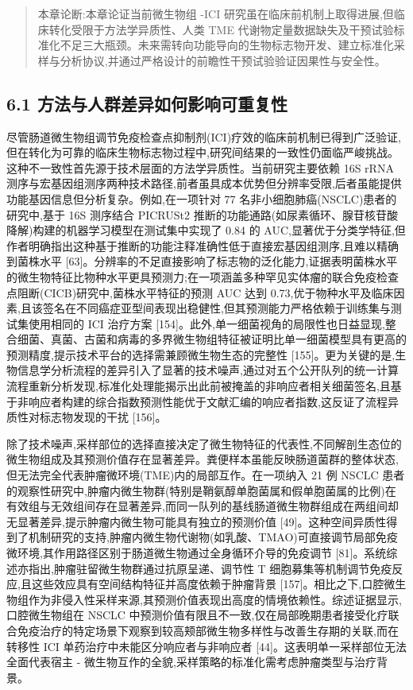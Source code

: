 \begin{quote}
本章论断:本章论证当前微生物组 -ICI 研究虽在临床前机制上取得进展,但临床转化受限于方法学异质性、人类 TME 代谢物定量数据缺失及干预试验标准化不足三大瓶颈。未来需转向功能导向的生物标志物开发、建立标准化采样与分析协议,并通过严格设计的前瞻性干预试验验证因果性与安全性。
\end{quote}

\subsection{6.1 方法与人群差异如何影响可重复性}\label{ux65b9ux6cd5ux4e0eux4ebaux7fa4ux5deeux5f02ux5982ux4f55ux5f71ux54cdux53efux91cdux590dux6027}

尽管肠道微生物组调节免疫检查点抑制剂(ICI)疗效的临床前机制已得到广泛验证,但在转化为可靠的临床生物标志物过程中,研究间结果的一致性仍面临严峻挑战。这种不一致性首先源于技术层面的方法学异质性。当前研究主要依赖 16S rRNA 测序与宏基因组测序两种技术路径,前者虽具成本优势但分辨率受限,后者虽能提供功能基因信息但分析复杂。例如,在一项针对 77 名非小细胞肺癌(NSCLC)患者的研究中,基于 16S 测序结合 PICRUSt2 推断的功能通路(如尿素循环、腺苷核苷酸降解)构建的机器学习模型在测试集中实现了 0.84 的 AUC,显著优于分类学特征,但作者明确指出这种基于推断的功能注释准确性低于直接宏基因组测序,且难以精确到菌株水平 {[}63{]}。分辨率的不足直接影响了标志物的泛化能力,证据表明菌株水平的微生物特征比物种水平更具预测力;在一项涵盖多种罕见实体瘤的联合免疫检查点阻断(CICB)研究中,菌株水平特征的预测 AUC 达到 0.73,优于物种水平及临床因素,且该签名在不同癌症亚型间表现出稳健性,但其预测能力严格依赖于训练集与测试集使用相同的 ICI 治疗方案 {[}154{]}。此外,单一细菌视角的局限性也日益显现,整合细菌、真菌、古菌和病毒的多界微生物组特征被证明比单一细菌模型具有更高的预测精度,提示技术平台的选择需兼顾微生物生态的完整性 {[}155{]}。更为关键的是,生物信息学分析流程的差异引入了显著的技术噪声,通过对五个公开队列的统一计算流程重新分析发现,标准化处理能揭示出此前被掩盖的非响应者相关细菌签名,且基于非响应者构建的综合指数预测性能优于文献汇编的响应者指数,这反证了流程异质性对标志物发现的干扰 {[}156{]}。

除了技术噪声,采样部位的选择直接决定了微生物特征的代表性,不同解剖生态位的微生物组成及其预测价值存在显著差异。粪便样本虽能反映肠道菌群的整体状态,但无法完全代表肿瘤微环境(TME)内的局部互作。在一项纳入 21 例 NSCLC 患者的观察性研究中,肿瘤内微生物群(特别是鞘氨醇单胞菌属和假单胞菌属的比例)在有效组与无效组间存在显著差异,而同一队列的基线肠道微生物群组成在两组间却无显著差异,提示肿瘤内微生物可能具有独立的预测价值 {[}49{]}。这种空间异质性得到了机制研究的支持,肿瘤内微生物代谢物(如乳酸、TMAO)可直接调节局部免疫微环境,其作用路径区别于肠道微生物通过全身循环介导的免疫调节 {[}81{]}。系统综述亦指出,肿瘤驻留微生物群通过抗原呈递、调节性 T 细胞募集等机制调节免疫反应,且这些效应具有空间结构特征并高度依赖于肿瘤背景 {[}157{]}。相比之下,口腔微生物组作为非侵入性采样来源,其预测价值表现出高度的情境依赖性。综述证据显示,口腔微生物组在 NSCLC 中预测价值有限且不一致,仅在局部晚期患者接受化疗联合免疫治疗的特定场景下观察到较高颊部微生物多样性与改善生存期的关联,而在转移性 ICI 单药治疗中未能区分响应者与非响应者 {[}44{]}。这表明单一采样部位无法全面代表宿主 - 微生物互作的全貌,采样策略的标准化需考虑肿瘤类型与治疗背景。

